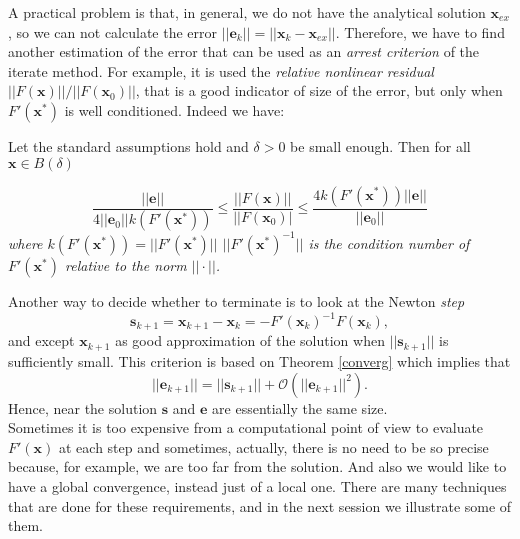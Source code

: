 A practical problem is that, in general, we do not have the analytical solution $\textbf{x}_{ex}$, so we can not calculate the error $||{\textbf{e}}_{k}|| = ||{\textbf{x}}_{k} - \textbf{x}_{ex}|| $. Therefore, we have to find another estimation of the error that can be used as an \textit{arrest criterion} of the iterate method.
For example, it is used the \textit{relative nonlinear residual} $||F(\textbf{x})||/||F({\textbf{x}}_{0})||$, that is a good indicator of size of the error, but only when $F'({\textbf{x}}^{*})$ is well conditioned. Indeed we have:
\begin{lem}
 Let the standard assumptions hold and $\delta > 0$ be small enough. Then for all $\textbf{x} \in \mathit{B(\delta)}$
\end{lem}

\begin{equation*}
\frac{||\textbf{e}||}{4 ||{\textbf{e}}_{0}|| \mathit{k}(F'({\textbf{x}}^{*}))} \leq \frac{||F(\textbf{x})||}{||F({\textbf{x}}_{0})|} \leq \frac{4 \mathit{k}(F'({\textbf{x}}^{*}))||\textbf{e}||}{||{\textbf{e}}_{0}||}
\end{equation*}
\textit{where $\mathit{k}(F'({\textbf{x}}^{*})) =||F'({\textbf{x}}^{*})||$ $ ||{F'({\textbf{x}}^{*})}^{-1}|| $ is the condition number of $F'({\textbf{x}}^{*})$ relative to the norm $||\cdot||$.}

\noindent Another way to decide whether to terminate is to look at the Newton \textit{step}
\begin{equation*}
{\textbf{s}}_{k+1} ={\textbf{x}}_{k+1} - {\textbf{x}}_{k}= -{F'({\textbf{x}}_{k})}^{-1}F({\textbf{x}}_{k}),
\end{equation*}
and except $ \textbf{x}_{k+1} $ as good approximation of the solution when $||{\textbf{s}}_{k+1}||$ is sufficiently small. This criterion is based on Theorem \ref{converg} which implies that 
\begin{equation*}
||{\textbf{e}}_{k+1}|| = ||{\textbf{s}}_{k+1}|| + \mathcal{O}({||{\textbf{e}}_{k+1}||}^{2}).
\end{equation*}
Hence, near the solution $\textbf{s}$ and $\textbf{e}$ are essentially the same size.\\ 

Sometimes it is too expensive from a computational point of view to evaluate $F'(\textbf{x})$ at each step and sometimes, actually, there is no need to be so precise because, for example, we are too far from the solution. And also we would like to have a global convergence, instead just of a local one. There are many techniques that are done for these requirements, and in the next session we illustrate some of them.
